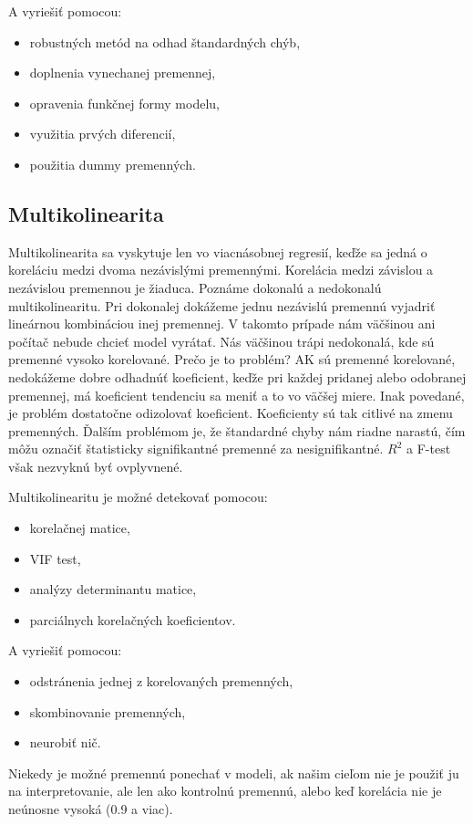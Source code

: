 A vyriešiť pomocou:

\begin{itemize}
\tightlist
\item
  robustných metód na odhad štandardných chýb,
\item
  doplnenia vynechanej premennej,
\item
  opravenia funkčnej formy modelu,
\item
  využitia prvých diferencií,
\item
  použitia dummy premenných.
\end{itemize}

\hypertarget{multikolinearita}{%
\subsection{Multikolinearita}\label{multikolinearita}}

Multikolinearita sa vyskytuje len vo viacnásobnej regresií, keďže sa
jedná o koreláciu medzi dvoma nezávislými premennými. Korelácia medzi
závislou a nezávislou premennou je žiaduca. Poznáme dokonalú a
nedokonalú multikolinearitu. Pri dokonalej dokážeme jednu nezávislú
premennú vyjadriť lineárnou kombináciou inej premennej. V takomto
prípade nám väčšinou ani počítač nebude chcieť model vyrátať. Nás
väčšinou trápi nedokonalá, kde sú premenné vysoko korelované. Prečo je
to problém? AK sú premenné korelované, nedokážeme dobre odhadnúť
koeficient, keďže pri každej pridanej alebo odobranej premennej, má
koeficient tendenciu sa meniť a to vo väčšej miere. Inak povedané, je
problém dostatočne odizolovať koeficient. Koeficienty sú tak citlivé na
zmenu premenných. Ďalším problémom je, že štandardné chyby nám riadne
narastú, čím môžu označiť štatisticky signifikantné premenné za
nesignifikantné. \(R^2\) a F-test však nezvyknú byť ovplyvnené.

Multikolinearitu je možné detekovať pomocou:

\begin{itemize}
\tightlist
\item
  korelačnej matice,
\item
  VIF test,
\item
  analýzy determinantu matice,
\item
  parciálnych korelačných koeficientov.
\end{itemize}

A vyriešiť pomocou:

\begin{itemize}
\tightlist
\item
  odstránenia jednej z korelovaných premenných,
\item
  skombinovanie premenných,
\item
  neurobiť nič.
\end{itemize}

Niekedy je možné premennú ponechať v modeli, ak našim cieľom nie je
použiť ju na interpretovanie, ale len ako kontrolnú premennú, alebo keď
korelácia nie je neúnosne vysoká (0.9 a viac).




